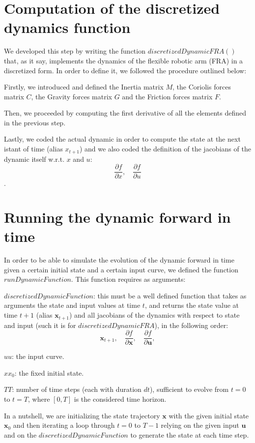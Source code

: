 \documentclass[a4paper,11pt,oneside]{book}
\begin{document}
\section{Computation of the discretized dynamics function}
\begin{justify}
    {We developed this step by writing the function $discretizedDynamicFRA()$ that, as it say, implements the dynamics of the flexible robotic arm (FRA) in a discretized form. In order to define it, we followed the procedure outlined below: }
\end{justify}
\begin{itemize}
    {\item Firstly, we introduced and defined the Inertia matrix $M$, the Coriolis forces matrix $C$, the Gravity forces matrix $G$ and the Friction forces matrix $F$.
    \item Then, we proceeded by computing the first derivative of all the elements defined in the previous step.
    \item Lastly, we coded the actual dynamic in order to compute the state at the next istant of time (alias \( x_{t+1} \)) and we also coded the definition of the jacobians of the dynamic itself w.r.t. \(x\) and \(u\): \[\frac{\partial f}{\partial x}, \quad \frac{\partial f}{\partial u}\].} 
\end{itemize}
\section{Running the dynamic forward in time}
\begin{justify}
    {In order to be able to simulate the evolution of the dynamic forward in time given a certain initial state and a certain input curve, we defined the function  $runDynamicFunction$. This function requires as arguments:}
\end{justify}
\begin{itemize}
    {\item \textbf {$discretizedDynamicFunction$}: this must be a well defined function that takes as arguments the state and input values at time \(t\), and returns the state value at time \(t+1\) (alias \(\mathbf{x}_{t+1}\)) and all jacobians of the dynamics with respect to state and input (such it is for $discretizedDynamicFRA$), in the following order: \[\mathbf{x}_{t+1}, \quad \frac{\partial f}{\partial \mathbf{x}}, \quad \frac{\partial f}{\partial \mathbf{u}},\]
    \item {$uu$}: the input curve.
    \item {$xx_{0}$}: the fixed initial state.
    \item {$TT$}: number of time steps (each with duration \(dt\)), sufficient to evolve from \(t = 0\) to \(t = T\), where \([0, T]\) is the considered time horizon.}  
\end{itemize}
\begin{justify}
    {In a nutshell, we are initializing the state trajectory \(\mathbf{x}\) with the given initial state \(\mathbf{x}_{0}\) and then iterating a loop through $t = 0$ to $T-1$ relying on the given input \(\mathbf{u}\) and on the $discretizedDynamicFunction$ to generate the state at each time step.}
\end{justify}
\end{document}
